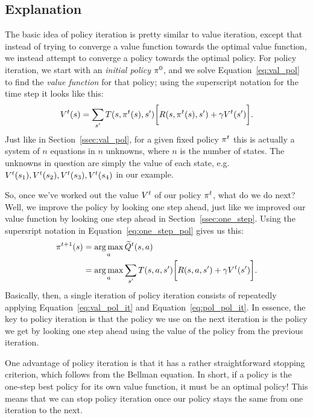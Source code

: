 \documentclass[a4paper]{article}
\begin{document}
\subsection{Explanation}
The basic idea of policy iteration is pretty similar to value iteration,
except that instead of trying to converge a value function towards the
optimal value function, we instead attempt to converge a policy towards
the optimal policy.
For policy iteration, we start with an \emph{initial policy} $\pi^0$,
and we solve Equation~\ref{eq:val_pol} to find the \emph{value function}
for that policy;
using the superscript notation for the time step it looks like this:
\begin{equation} \label{eq:val_pol_it}
  V^t(s) = \sum_{s'} T(s, \pi^t(s), s') \bigg[ R(s, \pi^t(s), s') + \gamma V^t(s') \bigg] .
\end{equation}
Just like in Section~\ref{ssec:val_pol}, for a given fixed policy $\pi^t$
this is actually a system of $n$ equations in $n$ unknowns, where $n$
is the number of states.
The unknowns in question are simply the value of each state, e.g.
$V^t(s_1), V^t(s_2), V^t(s_3), V^t(s_4)$ in our example.

So, once we've worked out the value $V^t$ of our policy $\pi^t$, what do we do next?
Well, we improve the policy by looking one step ahead, just like we improved our
value function by looking one step ahead in Section~\ref{ssec:one_step}.
Using the supersript notation in Equation~\ref{eq:one_step_pol} gives us this:
\begin{align}
  \pi^{t+1}(s) &= \operatorname*{arg\,max}_a \widetilde{Q}^t(s, a) \nonumber \\
                &= \operatorname*{arg\,max}_a \sum_{s'} T(s, a, s') \bigg[ R(s, a, s') + \gamma V^t(s') \bigg] . \label{eq:pol_pol_it}
\end{align}
Basically, then, a single iteration of policy iteration consists of repeatedly
applying Equation~\ref{eq:val_pol_it} and Equation~\ref{eq:pol_pol_it}.
In essence, the key to policy iteration is that the policy we use on the next
iteration is the policy we get by looking one step ahead using the value of the
policy from the previous iteration.

One advantage of policy iteration is that it has a rather straightforward
stopping criterion, which follows from the Bellman equation.
In short, if a policy is the one-step best policy for its own value function,
it must be an optimal policy!
This means that we can stop policy iteration once our policy stays the same
from one iteration to the next.
\end{document}
